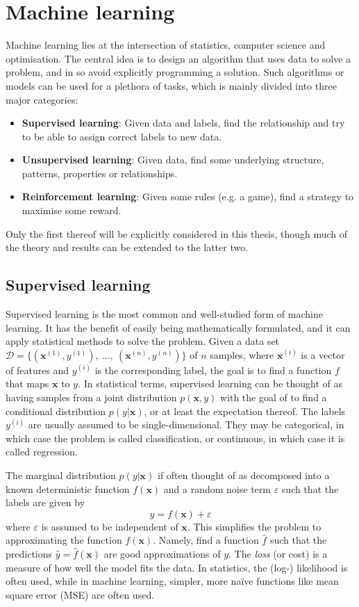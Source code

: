 \chapter{Machine learning}
\label{chap:ml}
Machine learning lies at the intersection of statistics, computer science and optimisation.
The central idea is to design an algorithm that uses data to solve a problem, and in so avoid explicitly programming a solution.
Such algorithms or models can be used for a plethora of tasks, which is mainly divided into three major categories:
\begin{itemize}
    \item \textbf{Supervised learning}: Given data and labels, find the relationship and try to be able to assign correct labels to new data.
    \item \textbf{Unsupervised learning}: Given data, find some underlying structure, patterns, properties or relationships.
    \item \textbf{Reinforcement learning}: Given some rules (e.g. a game), find a strategy to maximise some reward.
\end{itemize}
Only the first thereof will be explicitly considered in this thesis, though much of the theory and results can be extended to the latter two.

\section{Supervised learning}
Supervised learning is the most common and well-studied form of machine learning.
It has the benefit of easily being mathematically formulated, and it can apply statistical methods to solve the problem.
Given a data set
$
    \mathcal{D} = \{
    (\bm{x}^{(1)}, y^{(1)}), \
    \dots, \
    (\bm{x}^{(n)}, y^{(n)})
    \}
$
of $n$ samples, where $\bm{x}^{(i)}$ is a vector of features and $y^{(i)}$ is the corresponding label, the goal is to find a function $f$ that maps $\bm{x}$ to $y$.
In statistical terms, supervised learning can be thought of as having samples from a joint distribution $p(\bm{x}, y)$ with the goal of to find a conditional distribution $p(y|\bm{x})$, or at least the expectation thereof.
The labels $y^{(i)}$ are usually assumed to be single-dimensional.
They may be categorical, in which case the problem is called classification, or continuous, in which case it is called regression.

The marginal distribution $p(y|\bm{x})$ if often thought of as decomposed into a known deterministic function $f(\bm{x})$ and a random noise term $\varepsilon$ such that the labels are given by
\begin{equation}
    y = f(\bm{x}) + \varepsilon
    \label{eq:ml_model}
\end{equation}
where $\varepsilon$ is assumed to be independent of $\bm{x}$.
This simplifies the problem to approximating the function $f(\bm{x})$.
Namely, find a function $\hat{f}$ such that the predictions $\hat{y}=\hat{f}(\bm{x})$ are good approximations of $y$.
The \emph{loss} (or cost) is a measure of how well the model fits the data.
In statistics, the (log-) likelihood is often used, while in machine learning, simpler, more naïve functions like mean square error (MSE) are often used.


